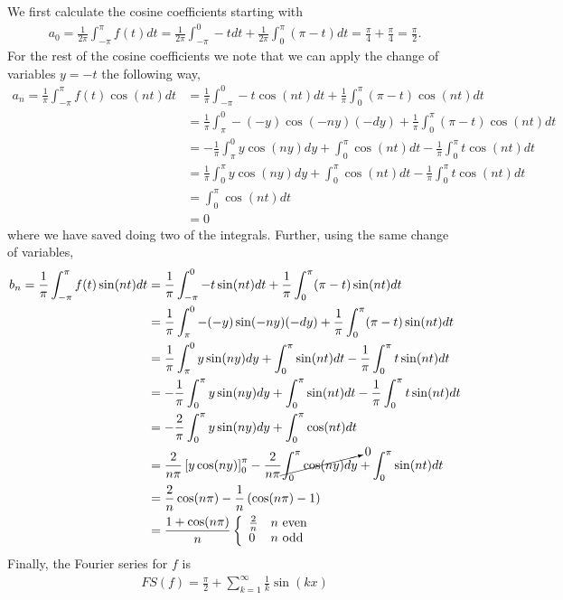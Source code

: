 \begin{questions}
\begin{solution}
We first calculate the cosine coefficients starting with
\begin{align*}
a_0=\frac{1}{2\pi}\int_{-\pi}^{\pi}f(t)dt=\frac{1}{2\pi}\int_{-\pi}^{0}-tdt+\frac{1}{2\pi}\int_{0}^{\pi}(\pi-t)dt=\frac{\pi}{4}+\frac{\pi}{4}=\frac{\pi}{2}.
\end{align*}
For the rest of the cosine coefficients we note that we can apply the change of variables $y=-t$ the following way,
\begin{align*}
a_n=\frac{1}{\pi}\int_{-\pi}^{\pi}f(t)\cos(nt)dt&=\frac{1}{\pi}\int_{-\pi}^{0}-t\cos(nt)dt+\frac{1}{\pi}\int_{0}^{\pi}(\pi-t)\cos(nt)dt\\
&=\frac{1}{\pi}\int_{\pi}^{0}-(-y)\cos(-ny)(-dy)+\frac{1}{\pi}\int_{0}^{\pi}(\pi-t)\cos(nt)dt\\
&=-\frac{1}{\pi}\int_{\pi}^{0}y\cos(ny)dy+\int_{0}^{\pi}\cos(nt)dt-\frac{1}{\pi}\int_{0}^{\pi}t\cos(nt)dt\\
&=\frac{1}{\pi}\int_{0}^{\pi}y\cos(ny)dy+\int_{0}^{\pi}\cos(nt)dt-\frac{1}{\pi}\int_{0}^{\pi}t\cos(nt)dt\\
&=\int_{0}^{\pi}\cos(nt)dt\\
&=0
\end{align*}
where we have saved doing two of the integrals. Further, using the same change of variables,
\begin{align*}
b_n=\frac{1}{\pi}\int_{-\pi}^{\pi}f(t)\sin(nt)dt&=\frac{1}{\pi}\int_{-\pi}^{0}-t\sin(nt)dt+\frac{1}{\pi}\int_{0}^{\pi}(\pi-t)\sin(nt)dt\\
&=\frac{1}{\pi}\int_{\pi}^{0}-(-y)\sin(-ny)(-dy)+\frac{1}{\pi}\int_{0}^{\pi}(\pi-t)\sin(nt)dt\\
&=\frac{1}{\pi}\int_{\pi}^{0}y\sin(ny)dy+\int_{0}^{\pi}\sin(nt)dt-\frac{1}{\pi}\int_{0}^{\pi}t\sin(nt)dt\\
&=-\frac{1}{\pi}\int_{0}^{\pi}y\sin(ny)dy+\int_{0}^{\pi}\sin(nt)dt-\frac{1}{\pi}\int_{0}^{\pi}t\sin(nt)dt\\
&=-\frac{2}{\pi}\int_{0}^{\pi}y\sin(ny)dy+\int_{0}^{\pi}\cos(nt)dt\\
&=\frac{2}{n\pi}\left[y\cos(ny)\right]_0^{\pi}-\frac{2}{n\pi}\cancelto{0}{\int_0^{\pi}\cos(ny)dy}+\int_0^{\pi}\sin(nt)dt\\
&=\frac{2}{n}\cos(n\pi)-\frac{1}{n}\left(\cos(n\pi)-1\right)\\
&=\frac{1+\cos(n\pi)}{n} \left\{
\begin{array}{ll}
      \frac{2}{n} & n $ even$ \\
      0 & n $ odd$ \\
\end{array} 
\right.\\
\end{align*}
Finally, the Fourier series for $f$ is
\begin{align*}
FS(f)=\frac{\pi}{2}+\sum_{k=1}^{\infty}\frac{1}{k}\sin(kx)
\end{align*}
\end{solution}
\end{questions}
